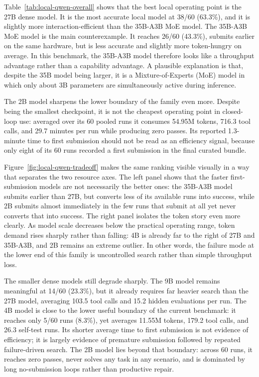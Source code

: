 \documentclass[a4paper,fleqn]{cas-dc}
\begin{document}
Table~\ref{tab:local-qwen-overall} shows that the best local operating point is the 27B dense model. It is the most accurate local model at 38/60 (63.3\%), and it is slightly more interaction-efficient than the 35B-A3B MoE model. The 35B-A3B MoE model is the main counterexample. It reaches 26/60 (43.3\%), submits earlier on the same hardware, but is less accurate and slightly more token-hungry on average. In this benchmark, the 35B-A3B model therefore looks like a throughput advantage rather than a capability advantage. A plausible explanation is that, despite the 35B model being larger, it is a Mixture-of-Experts (MoE) model \cite{shazeer2017outrageously} in which only about 3B parameters are simultaneously active during inference.

The 2B model sharpens the lower boundary of the family even more. Despite being the smallest checkpoint, it is not the cheapest operating point in closed-loop use: averaged over its 60 pooled runs it consumes 54.95M tokens, 716.3 tool calls, and 29.7 minutes per run while producing zero passes. Its reported 1.3-minute time to first submission should not be read as an efficiency signal, because only eight of its 60 runs recorded a first submission in the final curated bundle.

Figure~\ref{fig:local-qwen-tradeoff} makes the same ranking visible visually in a way that separates the two resource axes. The left panel shows that the faster first-submission models are not necessarily the better ones: the 35B-A3B model submits earlier than 27B, but converts less of its available runs into success, while 2B submits almost immediately in the few runs that submit at all yet never converts that into success. The right panel isolates the token story even more clearly. As model scale decreases below the practical operating range, token demand rises sharply rather than falling: 4B is already far to the right of 27B and 35B-A3B, and 2B remains an extreme outlier. In other words, the failure mode at the lower end of this family is uncontrolled search rather than simple throughput loss.

The smaller dense models still degrade sharply. The 9B model remains meaningful at 14/60 (23.3\%), but it already requires far heavier search than the 27B model, averaging 103.5 tool calls and 15.2 hidden evaluations per run. The 4B model is close to the lower useful boundary of the current benchmark: it reaches only 5/60 runs (8.3\%), yet averages 11.55M tokens, 179.2 tool calls, and 26.3 self-test runs. Its shorter average time to first submission is not evidence of efficiency; it is largely evidence of premature submission followed by repeated failure-driven search. The 2B model lies beyond that boundary: across 60 runs, it reaches zero passes, never solves any task in any scenario, and is dominated by long no-submission loops rather than productive repair.
\end{document}

